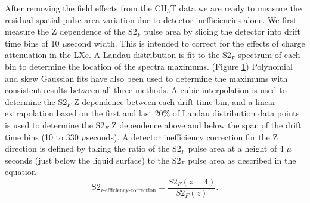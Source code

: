 After removing the field effects from the CH$_3$T data we are ready to measure the residual spatial pulse area variation due to detector inefficiencies alone.  We first measure the Z dependence of the S2$_F$ pulse area by slicing the detector into drift time bins of 10 $\mu$second width.  This is intended to correct for the effects of charge attenuation in the LXe. A Landau distribution is fit to the S2$_F$ spectrum of each bin to determine the location of the spectra maximums. (Figure \ref{fig:LandauPlot})  Polynomial and skew Gaussian fits have also been used to determine the maximums with consistent results between all three methods.  A cubic interpolation is used to determine the S2$_F$ Z dependence between each drift time bin, and a linear extrapolation based on the first and last 20\% of Landau distribution data points is used to determine the S2$_F$ Z dependence above and below the span of the drift time bins  (10 to 330 $\mu$seconds).  A detector inefficiency correction for the Z direction is defined by taking the ratio of the S2$_F$ pulse area at a height of 4 $\mu$seconds (just below the liquid surface) to the S2$_F$ pulse area as described in the equation
\begin{equation}\label{s2zcorr_eq}
\mbox{S}2_{\mbox{z-efficiency-correction}} = \frac{S2_F(z=4)}{S2_F(z)}.
\end{equation} 


\begin{figure} [!h]
\centering
{}
\qquad
{}
\label{fig:LandauPlot}
\end{figure}

